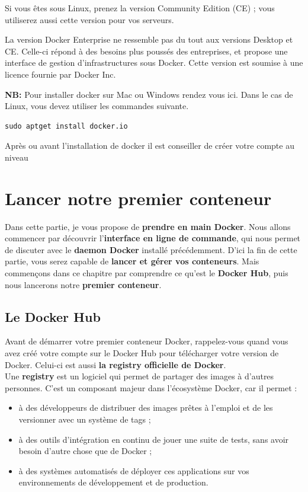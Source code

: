 \documentclass[12pt,a4paper]{article}
\begin{document}
Si vous êtes sous Linux, prenez la version Community Edition (CE) ; vous utiliserez aussi cette version pour vos serveurs.

La version Docker Enterprise ne ressemble pas du tout aux versions Desktop et CE. Celle-ci répond à des besoins plus poussés des entreprises, et propose une interface de gestion d'infrastructures sous Docker. Cette version est soumise à une licence fournie par Docker Inc.

\textbf{NB:} Pour installer docker sur Mac ou Windows rendez vous ici.
Dans le cas de Linux, vous devez utiliser les commandes suivante.
\begin{verbatim}
sudo aptget install docker.io
\end{verbatim}

Après ou avant l'installation de docker il est conseiller de créer votre compte au
niveau 

\section{Lancer notre premier conteneur}
Dans cette partie, je vous propose de \textbf{prendre en main Docker}. Nous allons 
commencer par découvrir l'\textbf{interface en ligne de commande}, qui nous permet
de discuter avec le \textbf{daemon Docker} installé précédemment. D'ici la fin de cette partie, vous serez capable de \textbf{lancer et gérer vos conteneurs}. Mais commençons dans ce chapitre par comprendre ce qu'est le \textbf{Docker Hub}, puis nous lancerons notre \textbf{premier conteneur}.

\subsection{Le Docker Hub}
Avant de démarrer votre premier conteneur Docker, rappelez-vous quand vous avez créé votre compte sur le Docker Hub pour télécharger votre version de Docker. Celui-ci est aussi 
\textbf{la registry officielle de Docker}.\\

Une \textbf{registry} est un logiciel qui permet de partager des images à d'autres personnes. C’est un composant majeur dans l’écosystème Docker, car il permet :

\begin{itemize}
\item à des développeurs de distribuer des images prêtes à l’emploi et de les versionner avec un système de tags ;
\item à des outils d’intégration en continu de jouer une suite de tests, sans avoir besoin d’autre chose que de Docker ;
\item à des systèmes automatisés de déployer ces applications sur vos environnements de développement et de production.
\end{itemize}
\end{document}
